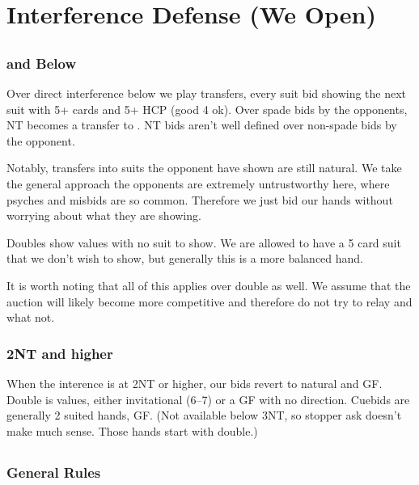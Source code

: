 \documentclass[tom-ari]{subfile}
\begin{document}
	
\chapter{Interference Defense (We Open)}
	
	\section[1C]{}
	
		\subsection[2S and Below]{ and Below}
		
		Over direct interference below  we play transfers, every suit bid showing the next suit with 5+ cards and 5+ HCP (good 4 ok). Over spade bids by the opponents, NT becomes a transfer to \clubsuit. NT bids aren't well defined over non-spade bids by the opponent. 
		
		Notably, transfers into suits the opponent have shown are still natural. We take the general approach the opponents are extremely untrustworthy here, where psyches and misbids are so common. Therefore we just bid our hands without worrying about what they are showing.
		
		Doubles show values with no suit to show. We are allowed to have a 5 card suit that we don't wish to show, but generally this is a more balanced hand.
	
		It is worth noting that all of this applies over double as well. We assume that the auction will likely become more competitive and therefore do not try to relay and what not. 
		
		\subsection{2NT and higher}
		
		When the interence is at 2NT or higher, our bids revert to natural and GF. Double is values, either invitational (6--7) or a GF with no direction. Cuebids are generally 2 suited hands, GF. (Not available below 3NT, so stopper ask doesn't make much sense. Those hands start with double.)
	
	\section[1D]{}
	
		\subsection{General Rules}
		
\end{document}
